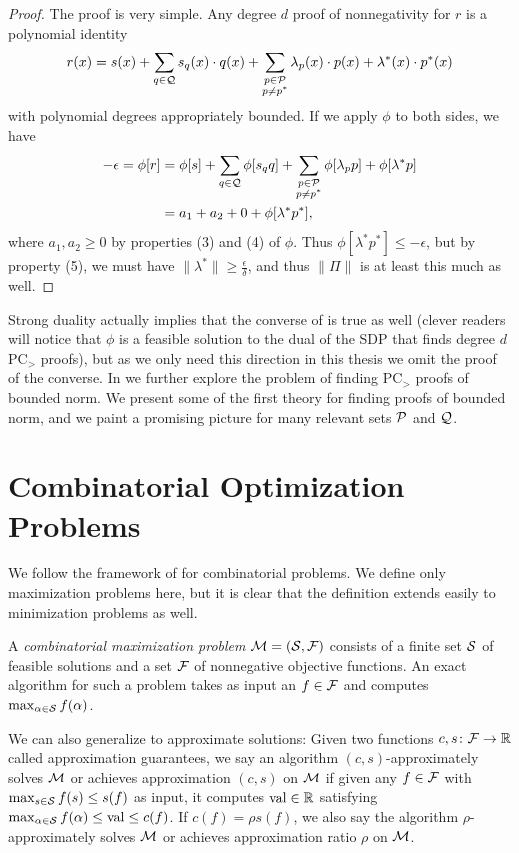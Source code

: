 \begin{proof}
The proof is very simple. Any degree $d$ proof of nonnegativity for $r$ is a polynomial identity
\[r(x) = s(x) + \sum_{q \in \mathcal Q} s_q(x)\cdot q(x) + \sum_{\substack{p \in \mathcal P \\ p \neq p^*}} \lambda_p(x) \cdot p(x) + \lambda^*(x) \cdot p^*(x)\]
with polynomial degrees appropriately bounded. If we apply $\phi$ to both sides, we have
\begin{align*}
-\epsilon = \phi[r] &= \phi[s] + \sum_{q \in \mathcal Q} \phi[s_qq] + \sum_{\substack{p \in \mathcal P \\ p \neq p^*}} \phi[\lambda_p p] + \phi[\lambda^*p] \\
&= a_1 + a_2 + 0 + \phi[\lambda^* p^*],
\end{align*}
where $a_1,a_2 \geq 0$ by properties (3) and (4) of $\phi$. Thus $\phi[\lambda^* p^*] \leq -\epsilon$, but by property (5), we must have $\|\lambda^*\| \geq \frac{\epsilon}{\delta}$, and thus $\|\Pi\|$ is at least this much as well.
\end{proof}
Strong duality actually implies that the converse of  is true as well (clever  readers will notice that $\phi$ is a feasible solution to the dual of the SDP that finds degree $d$ PC$_>$ proofs), but as we only need this direction in this thesis we omit the proof of the converse. In
 we further explore the problem of finding PC$_>$ proofs of bounded norm. We present some of the first theory  for finding proofs of bounded norm, and we paint a promising picture for many relevant sets $\mathcal P$ and $\mathcal Q$.

\section{Combinatorial Optimization Problems}\label{sec:prelims_comb_opt}
We follow the framework of \cite{BPZ15} for combinatorial problems.
We define only maximization problems here, but it is clear that the definition extends easily to minimization problems as well.
\begin{definition}
A \emph{combinatorial maximization problem} \(\mathcal M = (\mathcal S, \mathcal F)\)
consists of a finite set
\(\mathcal S\) of feasible solutions and a set \(\mathcal F\) of nonnegative
objective functions. An exact algorithm for such a problem takes as input an $f \in \mathcal F$ and computes
$\max_{\alpha \in \mathcal S} f(\alpha)$.

We can also generalize to approximate solutions: Given two functions \(c,s \colon \mathcal F \rightarrow \mathbb R\)
called approximation guarantees, we say
an algorithm \((c,s)\)-approximately solves \(\mathcal M\) or achieves approximation $(c,s)$ on $\mathcal M$
if given any \(f \in \mathcal F\) with \(\max_{s \in \mathcal S} f(s) \leq s(f)\) as input,
it computes \(\operatorname{val} \in \mathbb R\) satisfying
\(\max_{\alpha \in \mathcal S} f(\alpha) \leq \operatorname{val} \leq c(f)\).
If $c(f) = \rho s(f)$, we also say the algorithm $\rho$-approximately solves $\mathcal M$ or achieves approximation ratio $\rho$ on $\mathcal M$.
\end{definition}

